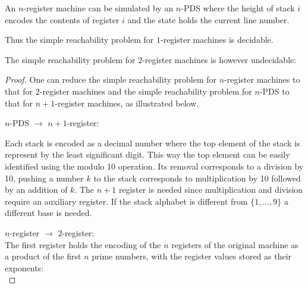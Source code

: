 \documentclass[english]{panikzettel}
\begin{document}
An $n$-register machine can be simulated by an $n$-PDS where the height of stack $i$ encodes the contents of register $i$ and the state holds the current line number.

Thus the simple reachability problem for $1$-register machines is decidable.

The simple reachability problem for $2$-register machines is however undecidable:

\begin{proof}
One can reduce the simple reachability problem for $n$-register machines to that for $2$-register machines and the simple reachability problem for $n$-PDS to that for $n+1$-register machines, as illustrated below.

$n$-PDS $\to$ $n+1$-register: \\

\begin{tightcenter}
\end{tightcenter}

Each stack is encoded as a decimal number where the top element of the stack is represent by the least significant digit. This way the top element can be easily identified using the modulo 10 operation. Its removal corresponds to a division by 10, pushing a number $k$ to the stack corresponds to multiplication by 10 followed by an addition of $k$. The $n +1$ register is needed since multiplication and division require an auxiliary register. If the stack alphabet is different from $\{1,\ldots,9\}$ a different base is needed.

$n$-register $\to$ $2$-register:\\
The first register holds the encoding of the $n$ registers of the original machine as a product of the first $n$ prime numbers, with the register values stored as their exponents: \\


\end{proof}
\end{document}
